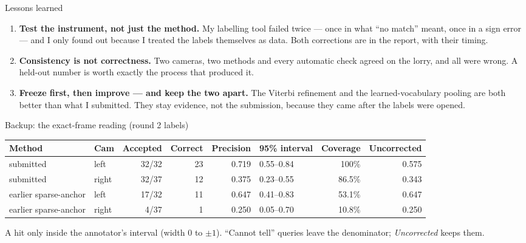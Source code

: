 \documentclass[10pt,aspectratio=169]{beamer}
\begin{document}
\begin{frame}{Lessons learned}
\begin{enumerate}\setlength{\itemsep}{8pt}
  \item \textbf{Test the instrument, not just the method.} My labelling tool failed twice --- once in what ``no match'' meant, once in a sign error --- and I only found out because I treated the labels themselves as data. Both corrections are in the report, with their timing.
  \item \textbf{Consistency is not correctness.} Two cameras, two methods and every automatic check agreed on the lorry, and all were wrong. A held-out number is worth exactly the process that produced it.
  \item \textbf{Freeze first, then improve --- and keep the two apart.} The Viterbi refinement and the learned-vocabulary pooling are both better than what I submitted. They stay evidence, not the submission, because they came after the labels were opened.
\end{enumerate}
\end{frame}

\appendix
\begin{frame}{Backup: the exact-frame reading (round 2 labels)}
\begin{center}\footnotesize
\setlength{\tabcolsep}{4pt}
\begin{tabular}{llrrrlrr}
\toprule
Method & Cam & Accepted & Correct & Precision & 95\% interval & Coverage & Uncorrected \\
\midrule
submitted & left & 32/32 & 23 & 0.719 & 0.55--0.84 & 100\% & 0.575 \\
submitted & right & 32/37 & 12 & 0.375 & 0.23--0.55 & 86.5\% & 0.343 \\
earlier sparse-anchor & left & 17/32 & 11 & 0.647 & 0.41--0.83 & 53.1\% & 0.647 \\
earlier sparse-anchor & right & 4/37 & 1 & 0.250 & 0.05--0.70 & 10.8\% & 0.250 \\
\bottomrule
\end{tabular}
\end{center}
A hit only inside the annotator's interval (width 0 to $\pm1$). ``Cannot tell'' queries leave the denominator; \emph{Uncorrected} keeps them.
\end{frame}
\end{document}
